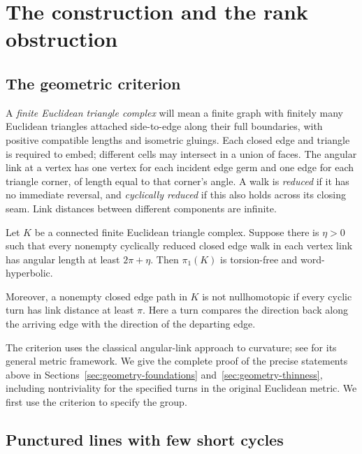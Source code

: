 \section{The construction and the rank obstruction}\label{sec:construction}

\subsection{The geometric criterion}

A \emph{finite Euclidean triangle complex} will mean a finite graph with finitely many Euclidean triangles attached side-to-edge along their full boundaries, with positive compatible lengths and isometric gluings. Each closed edge and triangle is required to embed; different cells may intersect in a union of faces. The angular link at a vertex has one vertex for each incident edge germ and one edge for each triangle corner, of length equal to that corner's angle. A walk is \emph{reduced} if it has no immediate reversal, and \emph{cyclically reduced} if this also holds across its closing seam. Link distances between different components are infinite.

\begin{theorem}\label{thm:triangle-complex}
Let $K$ be a connected finite Euclidean triangle complex. Suppose there is $\eta>0$ such that every nonempty cyclically reduced closed edge walk in each vertex link has angular length at least $2\pi+\eta$. Then $\pi_1(K)$ is torsion-free and word-hyperbolic.

Moreover, a nonempty closed edge path in $K$ is not nullhomotopic if every cyclic turn has link distance at least $\pi$. Here a turn compares the direction back along the arriving edge with the direction of the departing edge.
\end{theorem}

The criterion uses the classical angular-link approach to curvature;
see \cite[Theorem~II.5.2 and Lemma~II.5.6]{BH1999} for its general metric framework. We give
the complete proof of the precise statements above in
Sections~\ref{sec:geometry-foundations} and~\ref{sec:geometry-thinness},
including nontriviality for the specified turns in the original
Euclidean metric. We first use the criterion to specify the group.

\subsection{Punctured lines with few short cycles}

